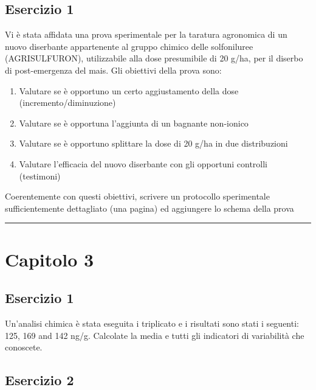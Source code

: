\documentclass[a4paper,12pt,oneside]{book}
\providecommand{\tightlist}{%
  \setlength{\itemsep}{0pt}\setlength{\parskip}{0pt}}
\begin{document}
\hypertarget{esercizio-1}{%
\subsection{Esercizio 1}\label{esercizio-1}}

Vi è stata affidata una prova sperimentale per la taratura agronomica di un nuovo diserbante appartenente al gruppo chimico delle solfoniluree (AGRISULFURON), utilizzabile alla dose presumibile di 20 g/ha, per il diserbo di post-emergenza del mais. Gli obiettivi della prova sono:

\begin{enumerate}
\def\labelenumi{\arabic{enumi}.}
\tightlist
\item
  Valutare se è opportuno un certo aggiustamento della dose (incremento/diminuzione)
\item
  Valutare se è opportuna l'aggiunta di un bagnante non-ionico
\item
  Valutare se è opportuno splittare la dose di 20 g/ha in due distribuzioni
\item
  Valutare l'efficacia del nuovo diserbante con gli opportuni controlli (testimoni)
\end{enumerate}

Coerentemente con questi obiettivi, scrivere un protocollo sperimentale sufficientemente dettagliato (una pagina) ed aggiungere lo schema della prova

\begin{center}\rule{0.5\linewidth}{0.5pt}\end{center}

\hypertarget{capitolo-3}{%
\section{Capitolo 3}\label{capitolo-3}}

\hypertarget{esercizio-1-1}{%
\subsection{Esercizio 1}\label{esercizio-1-1}}

Un'analisi chimica è stata eseguita i triplicato e i risultati sono stati i seguenti: 125, 169 and 142 ng/g. Calcolate la media e tutti gli indicatori di variabilità che conoscete.

\hypertarget{esercizio-2}{%
\subsection{Esercizio 2}\label{esercizio-2}}
\end{document}
